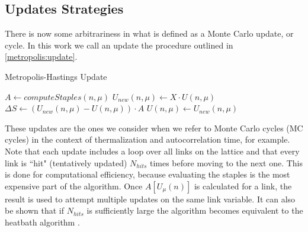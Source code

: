 \begin{figure}[!htb]

    \label{fig:staples}
\end{figure}


\subsection{Updates Strategies}
\label{sec:update}
There is now some arbitrariness in what is defined as a Monte Carlo update, or cycle. In this work we call an update the procedure outlined in \cref{metropolis:update}. 

\begin{algorithm}[bht!]
    \caption{Metropolis-Hastings Update}\label{metropolis:update}
    \begin{algorithmic}[1]
        \State $A \gets computeStaples(n,\mu)$     
            \State $U_{new}(n,\mu)  \gets X\cdot U(n,\mu)$  
            \State $\Delta S \gets (U_{new}(n,\mu)  - U(n,\mu) )\cdot A$
                \State $U(n,\mu)  \gets U_{new}(n,\mu)$
            \EndIf
        \EndFor
    \EndFor
\end{algorithmic}
\end{algorithm}

These updates are the ones we consider when we refer to Monte Carlo cycles (MC cycles) in the context of thermalization and autocorrelation time, for example. Note that each update includes a loop over all links on the lattice and that every link is ``hit" (tentatively updated) $N_{hits}$ times before moving to the next one. This is done for computational efficiency, because evaluating the staples is the most expensive part of the algorithm. Once $A[U_\mu(n)]$ is calculated for a link, the result is used to attempt multiple updates on the same link variable. It can also be shown that if $N_{hits}$ is sufficiently large the algorithm becomes equivalent to the heatbath algorithm \cite{gattringer_quantum_2010}. 

